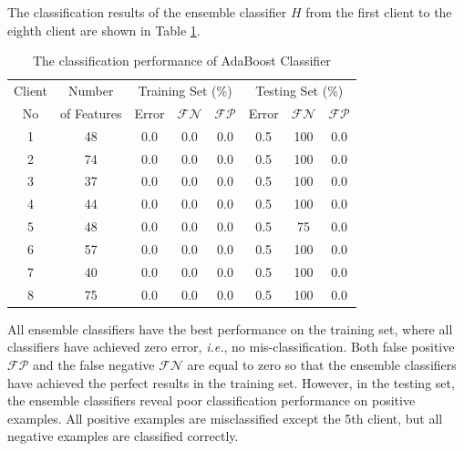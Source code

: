 The classification results of the ensemble classifier $H$ from the first client to the eighth client are shown in \mbox{Table} \ref{tab:normalresultsclassify}.
\begin{table}[ht]
\caption{The classification performance of AdaBoost Classifier}
\begin{center}
 \begin{tabular}{|c||c||c|c|c||c|c|c|}
  \hline
  Client & Number & \multicolumn{3}{c|}{Training Set (\%)} & \multicolumn{3}{c|}{Testing Set (\%)}\\
  \cline{3-8}
  No & of Features & Error & $ \mathcal{FN}$ & $ \mathcal{FP}$ & Error & $ \mathcal{FN}$ & $ \mathcal{FP}$ \\
  \hline
  1 & 48 & 0.0 & 0.0 & 0.0 & 0.5 & 100 & 0.0 \\
  2 & 74 & 0.0 & 0.0 & 0.0 & 0.5 & 100 & 0.0 \\
  3 & 37 & 0.0 & 0.0 & 0.0 & 0.5 & 100 & 0.0 \\
  4 & 44 & 0.0 & 0.0 & 0.0 & 0.5 & 100 & 0.0 \\
  5 & 48 & 0.0 & 0.0 & 0.0 & 0.5 & 75 & 0.0 \\
  6 & 57 & 0.0 & 0.0 & 0.0 & 0.5 & 100 & 0.0 \\
  7 & 40 & 0.0 & 0.0 & 0.0 & 0.5 & 100 & 0.0 \\
  8 & 75 & 0.0 & 0.0 & 0.0 & 0.5 & 100 & 0.0 \\
  \hline
 \end{tabular} 
\label{tab:normalresultsclassify}
\end{center}
\end{table} 
All ensemble classifiers have the best performance on the training set, where all classifiers have achieved zero error, \textit{i.e.}, no mis-classification. Both false positive $\mathcal{FP}$ and the false negative $\mathcal{FN}$ are equal to zero so that the ensemble classifiers have achieved the perfect results in the training set. However, in the testing set, the ensemble classifiers reveal poor classification performance on positive examples. All positive examples are misclassified except the 5th client, but all negative examples are classified correctly. %

